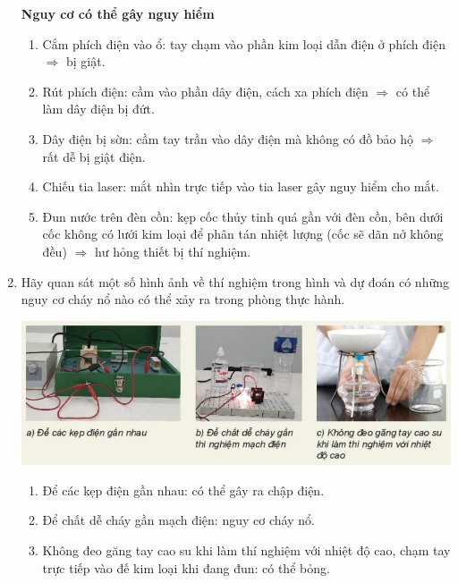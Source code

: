\begin{enumerate}[label=\bfseries Câu \arabic*:,leftmargin=1.5cm]
	\hideall
	{	
		\textbf{Nguy cơ có thể gây nguy hiểm}
		\begin{enumerate}[label=\alph*)]
			\item Cắm phích điện vào ổ: tay chạm vào phần kim loại dẫn điện ở phích điện $\Rightarrow$ bị giật.
			
			\item Rút phích điện: cầm vào phần dây điện, cách xa phích điện $\Rightarrow$ có thể làm dây điện bị đứt.
			
			\item Dây điện bị sờn: cầm tay trần vào dây điện mà không có đồ bảo hộ $\Rightarrow$ rất dễ bị giật điện.
			
			\item Chiếu tia laser: mắt nhìn trực tiếp vào tia laser gây nguy hiểm cho mắt.
			
			\item Đun nước trên đèn cồn: kẹp cốc thủy tinh quá gần với đèn cồn, bên dưới cốc không có lưới kim loại để phân tán nhiệt lượng (cốc sẽ dãn nở không đều) $\Rightarrow$ hư hỏng thiết bị thí nghiệm.
		\end{enumerate}
		
	}


	\item {}


{
	Hãy quan sát một số hình ảnh về thí nghiệm trong hình và dự đoán có những nguy cơ cháy nổ nào có thể xảy ra trong phòng thực hành.
	\begin{center}
		\includegraphics[scale=0.6]{../figs/VN10-2022-PH-TP003-7.jpg}
	\end{center}
}

\hideall
{	
	\begin{enumerate}[label=\alph*)]
		\item Để các kẹp điện gần nhau: có thể gây ra chập điện.
		\item Để chất dễ cháy gần mạch điện: nguy cơ cháy nổ.
		\item Không đeo găng tay cao su khi làm thí nghiệm với nhiệt độ cao, chạm tay trực tiếp vào đế kim loại khi đang đun: có thể bỏng.
	\end{enumerate}
}


\end{enumerate}
